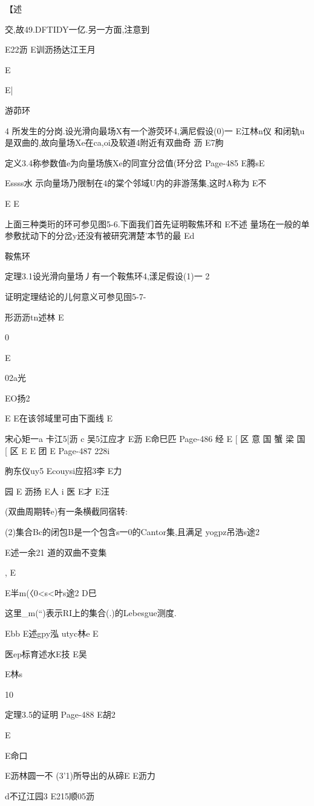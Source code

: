{{{{【述

交,故49.DFTIDY一亿.另一方面,注意到

E22沥
E训沥扬达江王月

E

E|

游茆环

4
所发生的分岗.设光滑向最场X有一个游荧环4,满尼假设(0)一
E江林n仪
和闭轨u是双曲的,故向量场Xe在ca,oi及软道4附近有双曲奇
沥
E7朐

定义3.4称参数值e为向量场族Xe的同宣分岔值(环分岔
Page-485
E腾sE

Essss水
示向量场乃限制在4的棠个邻域U内的非游荡集,这时A称为
E不

E
E

上面三种类珩的环可参见图5-6.下面我们首先证明鞍焦环和
E不述
量场在一般的单参敷扰动下的分岔y还没有被研究渭楚'本节的最
Ed

鞍焦环

定理3.1设光滑向量场丿有一个鞍焦环4,漾足假设(1)一
2

证明定理结论的儿何意义可参见囹5-7-

形沥沥tn述林
E

0

E

02a光

EO扬2

E
E在该邻域里可由下面线
E

宋心矩一a
卡江5[沥
c
吴5江应才
E沥
E命巳匹
Page-486
经
E
[
区
意
国
蟹
梁
国
[
区
E
E
团
E
Page-487
228i

朐东仪uy5
Ecouysi应招3李
E力

园
E
沥扬
E人
i
医
E才
E汪

(双曲周期转e)有一条横截同宿转:

(2)集合Bc的闭包B是一个包含s一0的Cantor集,且满足
yogpz吊浩s途2

E述一余21
道的双曲不变集},
E

E半m(〈0<s<叶s途2
D巳

这里_m(“)表示RI上的集合(.)的Lebesgue测度.

Ebb
E述gpy泓
utyc林e
E

医ep标育述水E技
E吴

E林s

10

定理3.5的证明
Page-488
E胡2

E

E命口

E沥林圆一不
(3'1)所导出的从碲E
E沥力

d不辽江园3
E215顺05沥

}}}
